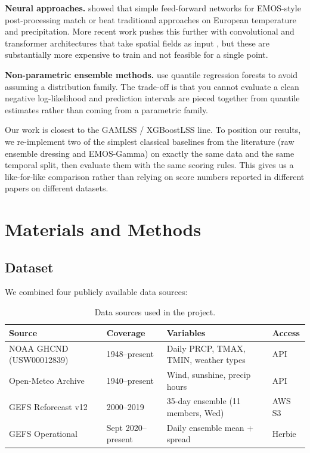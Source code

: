 \documentclass[11pt]{article}
\begin{document}
\textbf{Neural approaches.} \citet{rasp2018} showed that simple feed-forward networks for EMOS-style post-processing match or beat traditional approaches on European temperature and precipitation. More recent work pushes this further with convolutional and transformer architectures that take spatial fields as input \citep{gronquist2021,price2025graphcast}, but these are substantially more expensive to train and not feasible for a single point.

\textbf{Non-parametric ensemble methods.} \citet{taillardat2016} use quantile regression forests to avoid assuming a distribution family. The trade-off is that you cannot evaluate a clean negative log-likelihood and prediction intervals are pieced together from quantile estimates rather than coming from a parametric family.

Our work is closest to the GAMLSS / XGBoostLSS line. To position our results, we re-implement two of the simplest classical baselines from the literature (raw ensemble dressing and EMOS-Gamma) on exactly the same data and the same temporal split, then evaluate them with the same scoring rules. This gives us a like-for-like comparison rather than relying on score numbers reported in different papers on different datasets.

\section{Materials and Methods}

\subsection{Dataset}

We combined four publicly available data sources:

\begin{table}[H]
\centering
\small
\begin{tabular}{@{}llll@{}}
\toprule
\textbf{Source} & \textbf{Coverage} & \textbf{Variables} & \textbf{Access} \\
\midrule
NOAA GHCND (USW00012839) & 1948--present & Daily PRCP, TMAX, TMIN, weather types & API \\
Open-Meteo Archive       & 1940--present & Wind, sunshine, precip hours          & API \\
GEFS Reforecast v12      & 2000--2019    & 35-day ensemble (11 members, Wed)     & AWS S3 \\
GEFS Operational         & Sept 2020--present & Daily ensemble mean + spread     & Herbie \\
\bottomrule
\end{tabular}
\caption{Data sources used in the project.}
\label{tab:datasources}
\end{table}
\end{document}
